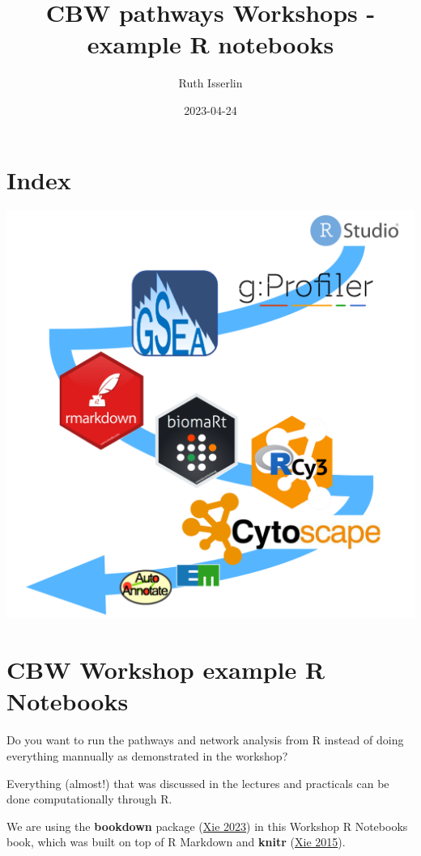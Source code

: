 \documentclass[
]{book}
\title{CBW pathways Workshops - example R notebooks}
\author{Ruth Isserlin}
\date{2023-04-24}
\begin{document}
\maketitle

{
\setcounter{tocdepth}{1}
\tableofcontents
}
\hypertarget{index}{%
\chapter{Index}\label{index}}

\includegraphics{./images/cover.png}

\hypertarget{intro}{%
\chapter{CBW Workshop example R Notebooks}\label{intro}}

Do you want to run the pathways and network analysis from R instead of doing everything mannually as demonstrated in the workshop?

Everything (almost!) that was discussed in the lectures and practicals can be done computationally through R.

We are using the \textbf{bookdown} package (\protect\hyperlink{ref-R-bookdown}{Xie 2023}) in this Workshop R Notebooks book, which was built on top of R Markdown and \textbf{knitr} (\protect\hyperlink{ref-xie2015}{Xie 2015}).
\end{document}
